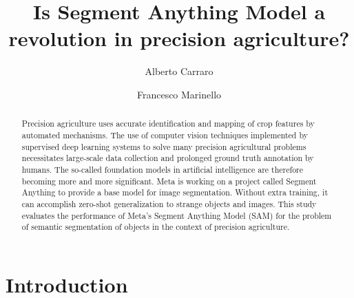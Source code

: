 \documentclass[runningheads]{llncs}
\begin{document}
%
\title{Is Segment Anything Model a revolution in precision agriculture?}
%
%


\author{
Alberto Carraro
\and
Francesco Marinello
}
%
%
\maketitle              %
%
\begin{abstract}
Precision agriculture uses accurate identification and mapping of crop features by automated mechanisms.  The use of computer vision techniques implemented by supervised deep learning systems to solve many precision agricultural problems necessitates large-scale data collection and prolonged ground truth annotation by humans. The so-called foundation models in artificial intelligence are therefore becoming more and more significant. Meta is working on a project called Segment Anything to provide a base model for image segmentation. Without extra training, it can accomplish zero-shot generalization to strange objects and images. This study evaluates the performance of Meta's Segment Anything Model (SAM) for the problem of semantic segmentation of objects in the context of precision agriculture.
\end{abstract}

\section{Introduction}
\end{document}
